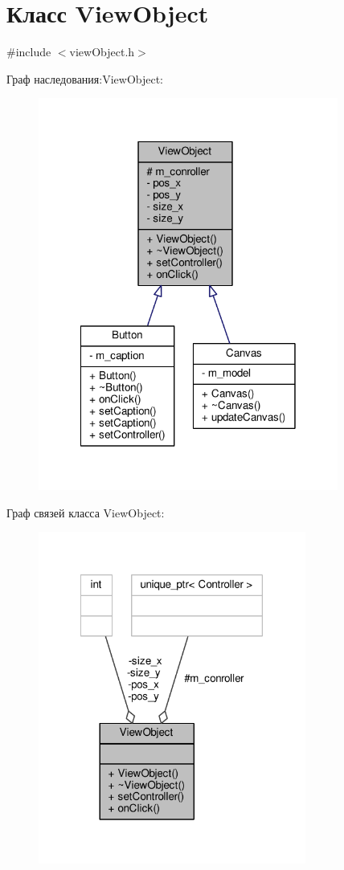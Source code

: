 \hypertarget{class_view_object}{\section{Класс View\-Object}
\label{class_view_object}
}


{\ttfamily \#include $<$view\-Object.\-h$>$}



Граф наследования\-:View\-Object\-:
\nopagebreak
\begin{figure}[H]
\begin{center}
\leavevmode
\includegraphics[width=279pt]{class_view_object__inherit__graph}
\end{center}
\end{figure}


Граф связей класса View\-Object\-:
\nopagebreak
\begin{figure}[H]
\begin{center}
\leavevmode
\includegraphics[width=249pt]{class_view_object__coll__graph}
\end{center}
\end{figure}
